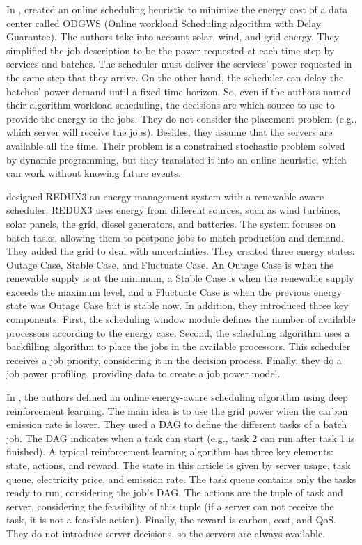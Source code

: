 In \cite{he2022online}, \citeauthor{he2022online} created an online scheduling heuristic to minimize the energy cost of a data center called ODGWS (Online workload Scheduling algorithm with Delay Guarantee). The authors take into account solar, wind, and grid energy. They simplified the job description to be the power requested at each time step by services and batches. The scheduler must deliver the services' power requested in the same step that they arrive. On the other hand, the scheduler can delay the batches' power demand until a fixed time horizon. So, even if the authors named their algorithm workload scheduling, the decisions are which source to use to provide the energy to the jobs. They do not consider the placement problem (e.g., which server will receive the jobs). Besides, they assume that the servers are available all the time. Their problem is a constrained stochastic problem solved by dynamic programming, but they translated it into an online heuristic, which can work without knowing future events.

\citeauthor{peng2022energy} \cite{peng2022energy} designed REDUX3 an energy management system with a renewable-aware scheduler. REDUX3 uses energy from different sources, such as wind turbines, solar panels, the grid, diesel generators, and batteries. The system focuses on batch tasks, allowing them to postpone jobs to match production and demand. They added the grid to deal with uncertainties. They created three energy states: Outage Case, Stable Case, and Fluctuate Case. An Outage Case is when the renewable supply is at the minimum, a Stable Case is when the renewable supply exceeds the maximum level, and a Fluctuate Case is when the previous energy state was Outage Case but is stable now. In addition, they introduced three key components. First, the scheduling window module defines the number of available processors according to the energy case. Second, the scheduling algorithm uses a backfilling algorithm to place the jobs in the available processors. This scheduler receives a job priority, considering it in the decision process. Finally, they do a job power profiling, providing data to create a job power model.

In \cite{liu2023online}, the authors defined an online energy-aware scheduling algorithm using deep reinforcement learning. The main idea is to use the grid power when the carbon emission rate is lower. They used a DAG to define the different tasks of a batch job. The DAG indicates when a task can start (e.g., task 2 can run after task 1 is finished). A typical reinforcement learning algorithm has three key elements: state, actions, and reward. The state in this article is given by server usage, task queue, electricity price, and emission rate. The task queue contains only the tasks ready to run, considering the job's DAG. The actions are the tuple of task and server, considering the feasibility of this tuple (if a server can not receive the task, it is not a feasible action). Finally, the reward is carbon, cost, and QoS. They do not introduce server decisions, so the servers are always available.

